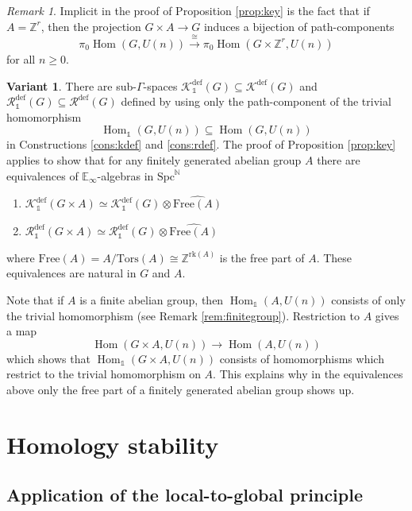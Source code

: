 \documentclass[oneside, a4paper, 12pt]{article}
\numberwithin{equation}{section}
\DeclareMathOperator{\Hom}{Hom}
\newcommand{\Kdef}{\mathcal{K}^{\mathrm{def}}}
\newcommand{\Rdef}{\mathcal{R}^{\mathrm{def}}}
\newcommand{\Spc}{\mathrm{Spc}}
\newcommand{\Z}{\mathbb{Z}}
\newcommand{\N}{\mathbb{N}}
\theoremstyle{plain}
\theoremstyle{definition}
\newtheorem{variant}[theorem]{Variant}
\theoremstyle{remark}
\newtheorem{remark}[theorem]{Remark}
\begin{document}
\begin{remark} \label{rem:pathconnected}
Implicit in the proof of Proposition \ref{prop:key} is the fact that if $A=\Z^r$, then the projection $G\times A\to G$ induces a bijection of path-components
\[
\pi_0 \Hom(G,U(n))\xrightarrow{\cong} \pi_0 \Hom(G\times \Z^r,U(n))
\]
for all $n\geq 0$.
\end{remark}

\begin{variant} \label{var:based}
There are sub-$\Gamma$-spaces $\Kdef_{\mathds{1}}(G)\subseteq \Kdef(G)$ and $\Rdef_{\mathds{1}}(G)\subseteq \Rdef(G)$ defined by using only the path-component of the trivial homomorphism
\[
\Hom_{\mathds{1}}(G,U(n))\subseteq \Hom(G,U(n))
\]
in Constructions \ref{cons:kdef} and \ref{cons:rdef}. The proof of Proposition \ref{prop:key} applies to show that for any finitely generated abelian group $A$ there are equivalences of $\mathbb{E}_\infty$-algebras in $\Spc^\N$
\begin{enumerate}
\item[(1)] $\Kdef_{\mathds{1}}(G\times A)\simeq \Kdef_{\mathds{1}}(G)\otimes \widehat{\mathrm{Free}(A)}$
\item[(2)] $\Rdef_{\mathds{1}}(G\times A)\simeq \Rdef_{\mathds{1}}(G)\otimes \widehat{\mathrm{Free}(A)}$
\end{enumerate}
where $\mathrm{Free}(A)=A/\mathrm{Tors}(A)\cong \Z^{\mathrm{rk}(A)}$ is the free part of $A$. These equivalences are natural in $G$ and $A$.
\end{variant}

Note that if $A$ is a finite abelian group, then $\Hom_{\mathds{1}}(A,U(n))$ consists of only the trivial homomorphism (see Remark \ref{rem:finitegroup}). Restriction to $A$ gives a map
\[
\Hom(G\times A,U(n))\to \Hom(A,U(n))
\]
which shows that $\Hom_{\mathds{1}}(G\times A,U(n))$ consists of homomorphisms which restrict to the trivial homomorphism on $A$. This explains why in the equivalences above only the free part of a finitely generated abelian group shows up.



\section{Homology stability} \label{sec:hs}


\subsection{Application of the local-to-global principle} \label{sec:hsproof}
\end{document}
